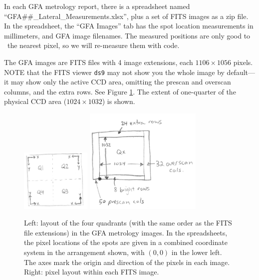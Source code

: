 \documentclass[10pt]{article}
\newcommand{\code}[1]{\texttt{#1}}
\begin{document}
In each GFA metrology report, there is a spreadsheet named
``GFA\#\#\_Lateral\_Measurements.xlsx'', plus a set of FITS images as a
zip file.  In the spreadsheet, the ``GFA Images'' tab has the spot
location measurements in millimeters, and GFA image filenames.  The
measured positions are only good to ~the nearest pixel, so we will
re-measure them with code.

The GFA images are FITS files with 4 image extensions, each $1106
\times 1056$ pixels.  NOTE that the FITS viewer \code{ds9} may not
show you the whole image by default---it may show only the active CCD
area, omitting the prescan and overscan columns, and the extra rows.
See Figure \ref{fig:metrologya}.  The extent of one-quarter of
the physical CCD area ($1024 \times 1032$) is shown.

\begin{figure}[h!]
  \begin{center}
    \includegraphics[width=0.3\textwidth]{gfa-metrology1a.jpeg}
    \includegraphics[width=0.5\textwidth]{gfa-metrology1b.jpeg}
  \end{center}
  \caption{\label{fig:metrologya}Left: layout of the four quadrants
    (with the same order as the FITS file extensions) in the GFA
    metrology images.  In the spreadsheets, the pixel locations of the
    spots are given in a combined coordinate system in the arrangement
    shown, with $(0,0)$ in the lower left. The axes mark the origin
    and direction of the pixels in each image.  Right: pixel layout
    within each FITS image.}
\end{figure}
\end{document}
